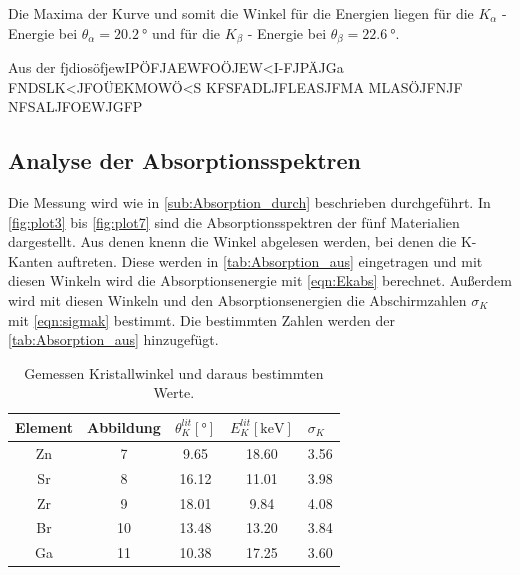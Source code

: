 Die Maxima der Kurve und somit die Winkel für die Energien liegen für die 
$K_\alpha$ -Energie  bei $\theta_\alpha=\qty{20.2}{\degree}$ und für die $K_\beta$ - Energie
bei $\theta_\beta=\qty{22.6}{\degree}$.

Aus der fjdiosöfjewIPÖFJAEWFOÖJEW<I-FJPÄJGa
FNDSLK<JFOÜEKMOWÖ<S
KFSFADLJFLEASJFMA
MLASÖJFNJF
NFSALJFOEWJGFP



\subsection{Analyse der Absorptionsspektren} %
\label{sub:Absorption_aus}
Die Messung wird wie in \autoref{sub:Absorption_durch} beschrieben durchgeführt.
In \autoref{fig:plot3} bis \ref{fig:plot7} sind die Absorptionsspektren der fünf Materialien dargestellt.
Aus denen knenn die Winkel abgelesen werden, bei denen die K-Kanten auftreten.
Diese werden in \autoref{tab:Absorption_aus} eingetragen und mit diesen Winkeln wird die Absorptionsenergie mit \autoref{eqn:Ekabs} berechnet.
Außerdem wird mit diesen Winkeln und den Absorptionsenergien die Abschirmzahlen $\sigma_K$ mit \autoref{eqn:sigmak} bestimmt.
Die bestimmten Zahlen werden der \autoref{tab:Absorption_aus} hinzugefügt.

\begin{table}[H]
  \centering
  \caption{Gemessen Kristallwinkel und daraus bestimmten Werte.}
  \label{tab:Vorbereitung}
  \begin{tabular}{c S[table-format=2.0] S S[table-format=1.2] }
  \toprule
  {Element} & {Abbildung} & {$\theta_{K}^{lit} [\si{\degree}]$} & {$E_{K}^{lit} [\si{\kilo\electronvolt}]$}& {$\sigma_K$}\\
  \midrule
    Zn & 7 &  9.65 & 18.60 & 3.56 \\
    Sr & 8 & 16.12 & 11.01 & 3.98 \\
    Zr & 9 & 18.01 &  9.84 & 4.08 \\
    Br & 10 & 13.48 & 13.20 & 3.84 \\
    Ga & 11 & 10.38 & 17.25 & 3.60 \\ 
  \bottomrule
  \end{tabular}
\end{table}

